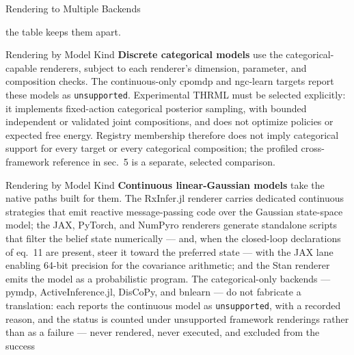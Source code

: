 \documentclass[
  ignorenonframetext,
]{beamer}
\newenvironment{archivecaptionframe}{\par\begingroup}{\par\endgroup}
\begin{document}
\begin{frame}{Rendering to Multiple Backends}

\begin{archivecaptionframe}

the table keeps them apart.

\end{archivecaptionframe}


\end{frame}

\begin{frame}{Rendering by Model Kind}
\protect{}\label{rendering-by-model-kind}
\textbf{Discrete categorical models} use the categorical-capable
renderers, subject to each renderer's dimension, parameter, and
composition checks. The continuous-only cpomdp and ngc-learn targets
report these models as \texttt{unsupported}. Experimental THRML must be
selected explicitly: it implements fixed-action categorical posterior
sampling, with bounded independent or validated joint compositions, and
does not optimize policies or expected free energy. Registry membership
therefore does not imply categorical support for every target or every
categorical composition; the profiled cross-framework reference in
sec.~5 is a separate, selected comparison.

\end{frame}

\begin{frame}{Rendering by Model Kind}
\textbf{Continuous linear-Gaussian models} take the native paths built
for them. The RxInfer.jl renderer carries dedicated continuous
strategies that emit reactive message-passing code over the Gaussian
state-space model; the JAX, PyTorch, and NumPyro renderers generate
standalone scripts that filter the belief state numerically --- and,
when the closed-loop declarations of eq.~11 are
present, steer it toward the preferred state --- with the JAX lane
enabling 64-bit precision for the covariance arithmetic; and the Stan
renderer emits the model as a probabilistic program. The
categorical-only backends --- pymdp, ActiveInference.jl, DisCoPy, and
bnlearn --- do not fabricate a translation: each reports the continuous
model as \texttt{unsupported}, with a recorded reason, and the status is
counted under unsupported framework renderings rather than as a failure
--- never rendered, never executed, and excluded from the success
\end{frame}
\end{document}
